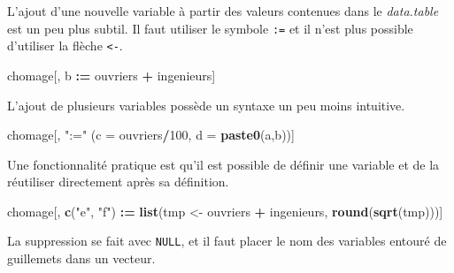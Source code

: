 \documentclass[
  11pt,
]{book}
\newenvironment{Shaded}{\begin{snugshade}}{\end{snugshade}}
\newcommand{\CommentTok}[1]{\textcolor[rgb]{0.56,0.35,0.01}{\textit{#1}}}
\newcommand{\DataTypeTok}[1]{\textcolor[rgb]{0.13,0.29,0.53}{#1}}
\newcommand{\DecValTok}[1]{\textcolor[rgb]{0.00,0.00,0.81}{#1}}
\newcommand{\ErrorTok}[1]{\textcolor[rgb]{0.64,0.00,0.00}{\textbf{#1}}}
\newcommand{\KeywordTok}[1]{\textcolor[rgb]{0.13,0.29,0.53}{\textbf{#1}}}
\newcommand{\NormalTok}[1]{#1}
\newcommand{\OperatorTok}[1]{\textcolor[rgb]{0.81,0.36,0.00}{\textbf{#1}}}
\newcommand{\StringTok}[1]{\textcolor[rgb]{0.31,0.60,0.02}{#1}}
\numberwithin{equation}{section}
\numberwithin{countremarque}{section}
\begin{document}
\begin{Shaded}
\end{Shaded}

L'ajout d'une nouvelle variable à partir des valeurs contenues dans le \emph{data.table} est un peu plus subtil. Il faut utiliser le symbole \texttt{:=} et il n'est plus possible d'utiliser la flèche \texttt{\textless{}-}.

\begin{Shaded}
\begin{Highlighting}[]
\NormalTok{chomage[, b }\OperatorTok{:}\ErrorTok{=}\StringTok{ }\NormalTok{ouvriers }\OperatorTok{+}\StringTok{ }\NormalTok{ingenieurs]}
\end{Highlighting}
\end{Shaded}

L'ajout de plusieurs variables possède un syntaxe un peu moins intuitive.

\begin{Shaded}
\begin{Highlighting}[]
\NormalTok{chomage[, }\StringTok{":="}\NormalTok{ (}\DataTypeTok{c =}\NormalTok{ ouvriers}\OperatorTok{/}\DecValTok{100}\NormalTok{, }\DataTypeTok{d =} \KeywordTok{paste0}\NormalTok{(a,b))]}
\end{Highlighting}
\end{Shaded}

Une fonctionnalité pratique est qu'il est possible de définir une variable et de la réutiliser directement après sa définition.

\begin{Shaded}
\begin{Highlighting}[]
\NormalTok{chomage[, }\KeywordTok{c}\NormalTok{(}\StringTok{"e"}\NormalTok{, }\StringTok{"f"}\NormalTok{) }\OperatorTok{:}\ErrorTok{=}\StringTok{ }\KeywordTok{list}\NormalTok{(tmp \textless{}{-}}\StringTok{ }\NormalTok{ouvriers }\OperatorTok{+}\StringTok{ }\NormalTok{ingenieurs,}
                              \KeywordTok{round}\NormalTok{(}\KeywordTok{sqrt}\NormalTok{(tmp)))]}
\end{Highlighting}
\end{Shaded}

La suppression se fait avec \texttt{NULL}, et il faut placer le nom des variables entouré de guillemets dans un vecteur.
\end{document}
